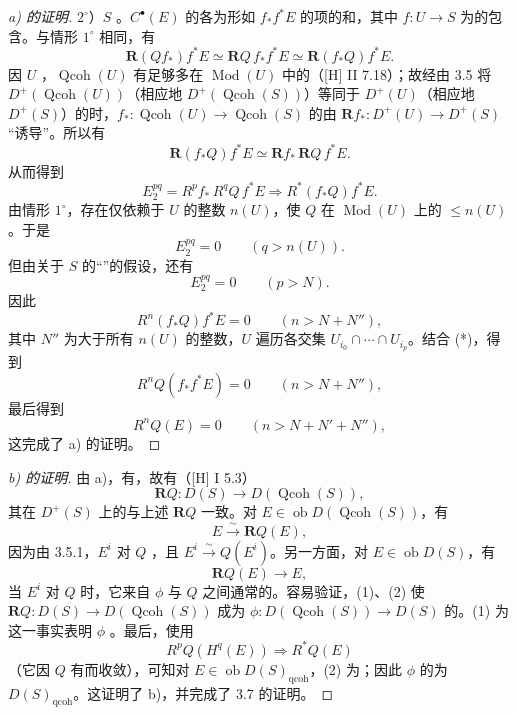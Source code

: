 \begin{proof}[a) 的证明]
$2^\circ$）$S$ 。$C^\bullet(E)$ 的各为形如 $f_*f^*E$ 的项的和，其中 $f:U\to S$ 为的包含。与情形 $1^\circ$ 相同，有
\[
\mathbf R(Qf_*)f^*E\simeq\mathbf RQ\,f_*f^*E\simeq\mathbf R(f_*Q)f^*E.\tag{*}
\]
因 $U$ ，$\operatorname{Qcoh}(U)$ 有足够多在 $\operatorname{Mod}(U)$ 中的（[H] II 7.18）；故经由 3.5 将 $D^+(\operatorname{Qcoh}(U))$（相应地 $D^+(\operatorname{Qcoh}(S))$）等同于 $D^+(U)$（相应地 $D^+(S)$）的时，$f_*:\operatorname{Qcoh}(U)\to\operatorname{Qcoh}(S)$ 的由 $\mathbf Rf_*:D^+(U)\to D^+(S)$ “诱导”。所以有
\[
\mathbf R(f_*Q)f^*E\simeq\mathbf Rf_*\,\mathbf RQ\,f^*E.
\]
从而得到
\[
E_2^{pq}=R^pf_*\,R^qQ\,f^*E\Longrightarrow R^*(f_*Q)f^*E.
\]
由情形 $1^\circ$，存在仅依赖于 $U$ 的整数 $n(U)$，使 $Q$ 在 $\operatorname{Mod}(U)$ 上的 $\leq n(U)$。于是
\[
E_2^{pq}=0\qquad(q>n(U)).
\]
但由关于 $S$ 的“”的假设，还有
\[
E_2^{pq}=0\qquad(p>N).
\]
因此
\[
R^n(f_*Q)f^*E=0\qquad(n>N+N''),
\]
其中 $N''$ 为大于所有 $n(U)$ 的整数，$U$ 遍历各交集 $U_{i_0}\cap\cdots\cap U_{i_p}$。结合 (*)，得到
\[
R^nQ(f_*f^*E)=0\qquad(n>N+N''),
\]
最后得到
\[
R^nQ(E)=0\qquad(n>N+N'+N''),
\]
这完成了 a) 的证明。
\end{proof}
\begin{proof}[b) 的证明]
由 a)，有，故有（[H] I 5.3）
\[
\mathbf RQ:D(S)\longrightarrow D(\operatorname{Qcoh}(S)),
\]
其在 $D^+(S)$ 上的与上述 $\mathbf RQ$ 一致。对 $E\in\operatorname{ob}D(\operatorname{Qcoh}(S))$，有
\[
E\xrightarrow{\sim}\mathbf RQ(E),\tag{1}
\]
因为由 3.5.1，$E^i$ 对 $Q$ ，且 $E^i\xrightarrow{\sim}Q(E^i)$。另一方面，对 $E\in\operatorname{ob}D(S)$，有
\[
\mathbf RQ(E)\longrightarrow E,\tag{2}
\]
当 $E^i$ 对 $Q$ 时，它来自 $\phi$ 与 $Q$ 之间通常的。容易验证，(1)、(2) 使 $\mathbf RQ:D(S)\to D(\operatorname{Qcoh}(S))$ 成为 $\phi:D(\operatorname{Qcoh}(S))\to D(S)$ 的。(1) 为这一事实表明 $\phi$ 。最后，使用
\[
R^pQ(H^q(E))\Longrightarrow R^*Q(E)
\]
（它因 $Q$ 有而收敛），可知对 $E\in\operatorname{ob}D(S)_{\mathrm{qcoh}}$，(2) 为；因此 $\phi$ 的为 $D(S)_{\mathrm{qcoh}}$。这证明了 b)，并完成了 3.7 的证明。
\end{proof}
